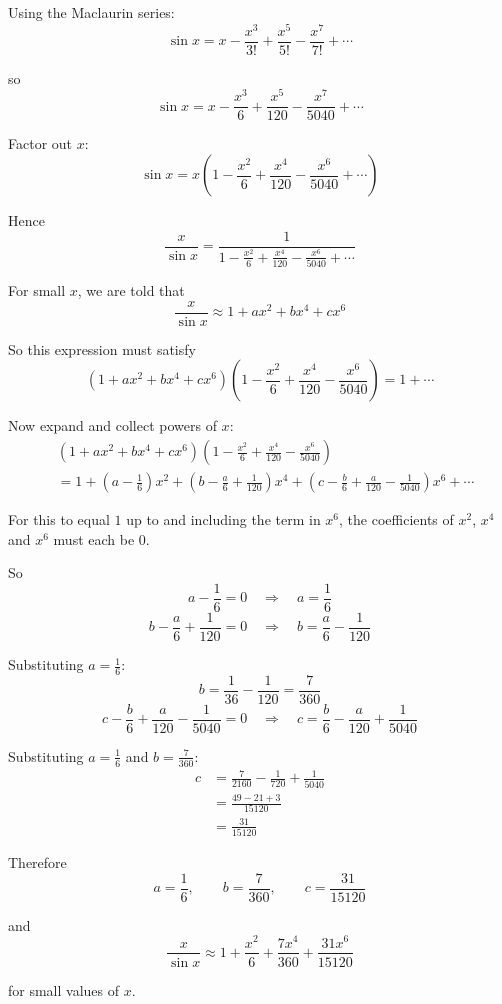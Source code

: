 \documentclass[leqno]{article}
\begin{document}
\begin{enumerate}[
  label=\textbf{\arabic*.},
  leftmargin=*,
  topsep=0pt,
  partopsep=0pt,
  parsep=0pt
]
\begin{djsSolution}
Using the Maclaurin series:
\[
\sin x=x-\frac{x^3}{3!}+\frac{x^5}{5!}-\frac{x^7}{7!}+\cdots
\]

so
\[
\sin x=x-\frac{x^3}{6}+\frac{x^5}{120}-\frac{x^7}{5040}+\cdots
\]

Factor out $x$:
\[
\sin x=x\left(1-\frac{x^2}{6}+\frac{x^4}{120}-\frac{x^6}{5040}+\cdots\right)
\]

Hence
\[
\frac{x}{\sin x}
=\frac{1}{1-\frac{x^2}{6}+\frac{x^4}{120}-\frac{x^6}{5040}+\cdots}
\]

For small $x$, we are told that
\[
\frac{x}{\sin x}\approx 1+ax^2+bx^4+cx^6
\]

So this expression must satisfy
\[
(1+ax^2+bx^4+cx^6)\left(1-\frac{x^2}{6}+\frac{x^4}{120}-\frac{x^6}{5040}\right)=1+\cdots
\]

Now expand and collect powers of $x$:
\begin{align*}
&(1+ax^2+bx^4+cx^6)\left(1-\frac{x^2}{6}+\frac{x^4}{120}-\frac{x^6}{5040}\right) \\
&=1+\left(a-\frac16\right)x^2+\left(b-\frac{a}{6}+\frac1{120}\right)x^4
+\left(c-\frac{b}{6}+\frac{a}{120}-\frac1{5040}\right)x^6+\cdots
\end{align*}

For this to equal \(1\) up to and including the term in \(x^6\), the coefficients of \(x^2\), \(x^4\) and \(x^6\) must each be \(0\).

So
\[
a-\frac16=0
\quad\Longrightarrow\quad
a=\frac16
\]
\[
b-\frac{a}{6}+\frac1{120}=0
\quad\Longrightarrow\quad
b=\frac{a}{6}-\frac1{120}
\]

Substituting $a=\frac16$:
\[
b=\frac{1}{36}-\frac{1}{120}
=\frac{7}{360}
\]
\[
c-\frac{b}{6}+\frac{a}{120}-\frac1{5040}=0
\quad\Longrightarrow\quad
c=\frac{b}{6}-\frac{a}{120}+\frac1{5040}
\]

Substituting $a=\frac16$ and $b=\frac7{360}$:
\begin{align*}
c&=\frac{7}{2160}-\frac{1}{720}+\frac{1}{5040}\\
&=\frac{49-21+3}{15120}\\
&=\frac{31}{15120}
\end{align*}

Therefore
\[
a=\frac16,\qquad b=\frac7{360},\qquad c=\frac{31}{15120}
\]

and
\[
\frac{x}{\sin x}\approx 1+\frac{x^2}{6}+\frac{7x^4}{360}+\frac{31x^6}{15120}
\]

for small values of $x$.
\end{djsSolution}



\end{enumerate}
\end{document}
